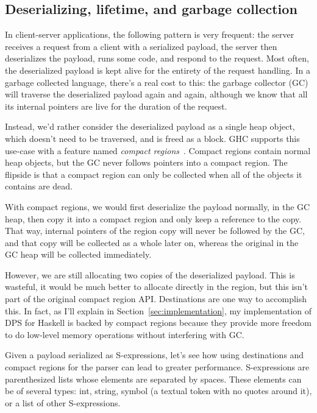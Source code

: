 \documentclass[english]{jflart}
\begin{document}
\subsection{Deserializing, lifetime, and garbage collection}\label{ssec:parser-sexpr}

In client-server applications, the following pattern is very frequent: the server receives a request from a client with a serialized payload, the server then deserializes the payload, runs some code, and respond to the request. Most often, the deserialized payload is kept alive for the entirety of the request handling. In a garbage collected language, there's a real cost to this: the garbage collector (GC) will traverse the deserialized payload again and again, although we know that all its internal pointers are live for the duration of the request.

Instead, we'd rather consider the deserialized payload as a single heap object, which doesn't need to be traversed, and is freed as a block. GHC supports this use-case with a feature named \emph{compact regions}~\cite{yang_efficient_2015}. Compact regions contain normal heap objects, but the GC never follows pointers into a compact region. The flipside is that a compact region can only be collected when all of the objects it contains are dead.

With compact regions, we would first deserialize the payload normally, in the GC heap, then copy it into a compact region and only keep a reference to the copy. That way, internal pointers of the region copy will never be followed by the GC, and that copy will be collected as a whole later on, whereas the original in the GC heap will be collected immediately.

However, we are still allocating two copies of the deserialized payload. This is wasteful, it would be much better to allocate directly in the region, but this isn't part of the original compact region API. Destinations are one way to accomplish this. In fact, as I'll explain in Section~\ref{sec:implementation}, my implementation of DPS for Haskell is backed by compact regions because they provide more freedom to do low-level memory operations without interfering with GC.

Given a payload serialized as S-expressions, let's see how using destinations and compact regions for the parser can lead to greater performance. S-expressions are parenthesized lists whose elements are separated by spaces. These elements can be of several types: int, string, symbol (a textual token with no quotes around it), or a list of other S-expressions.
\end{document}

